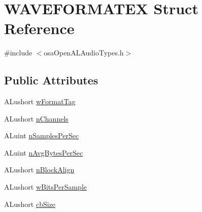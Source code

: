 \hypertarget{struct_w_a_v_e_f_o_r_m_a_t_e_x}{\section{W\-A\-V\-E\-F\-O\-R\-M\-A\-T\-E\-X Struct Reference}
\label{struct_w_a_v_e_f_o_r_m_a_t_e_x}
}


{\ttfamily \#include $<$osa\-Open\-A\-L\-Audio\-Types.\-h$>$}

\subsection*{Public Attributes}
\begin{DoxyCompactItemize}
\item 
A\-Lushort \hyperlink{struct_w_a_v_e_f_o_r_m_a_t_e_x_ae64cc7e3612e90153b9c85278e819661}{w\-Format\-Tag}
\item 
A\-Lushort \hyperlink{struct_w_a_v_e_f_o_r_m_a_t_e_x_a723622211fcfa3371a72f4b2955c0adf}{n\-Channels}
\item 
A\-Luint \hyperlink{struct_w_a_v_e_f_o_r_m_a_t_e_x_a32952b7d978d3cb6032ddbcddde933ce}{n\-Samples\-Per\-Sec}
\item 
A\-Luint \hyperlink{struct_w_a_v_e_f_o_r_m_a_t_e_x_a9c4552a741e95a77db5ca70559aa460b}{n\-Avg\-Bytes\-Per\-Sec}
\item 
A\-Lushort \hyperlink{struct_w_a_v_e_f_o_r_m_a_t_e_x_a3b2bf371bd87c8e3ed7d7ed451b19b2c}{n\-Block\-Align}
\item 
A\-Lushort \hyperlink{struct_w_a_v_e_f_o_r_m_a_t_e_x_a7131210349a03e87c94d2f08a1530002}{w\-Bits\-Per\-Sample}
\item 
A\-Lushort \hyperlink{struct_w_a_v_e_f_o_r_m_a_t_e_x_afe171567c7025baab483b46cb1ec54bb}{cb\-Size}
\end{DoxyCompactItemize}



